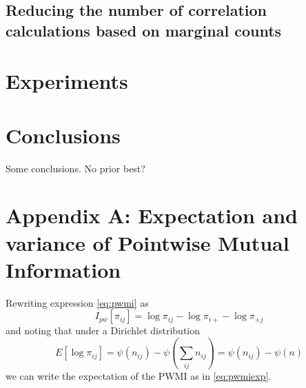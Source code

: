 \documentclass[conference]{IEEEtran}
\newcommand{\digamma}{\psi}
\begin{document}
\subsection{Reducing the number of correlation calculations based on marginal counts}

\section{Experiments}

\section{Conclusions}

Some conclusions. No prior best?

\section*{Appendix A: Expectation and variance of Pointwise Mutual Information}

Rewriting expression \ref{eq:pwmi} as
\begin{equation}
I_{pw}[\pi_{ij}] = \log \pi_{ij} - \log \pi_{i+} - \log \pi_{+j}
\end{equation}
and noting that under a Dirichlet distribution
\begin{equation}
E[\log \pi_{ij}] = \digamma(n_{ij}) - \digamma \left(\sum_{ij} n_{ij} \right) =
\digamma(n_{ij}) - \digamma(n)
\end{equation}
we can write the expectation of the PWMI as in \ref{eq:pwmiexp}.
\end{document}
